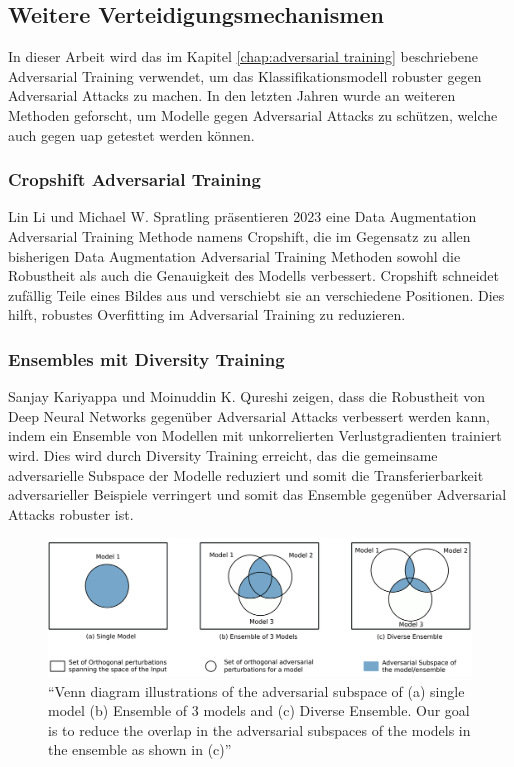 \subsection{Weitere Verteidigungsmechanismen} \label{chap:Weitere Verteidigungsmechanismen}
In dieser Arbeit wird das im Kapitel \ref{chap:adversarial training} beschriebene Adversarial Training verwendet, um das Klassifikationsmodell robuster gegen Adversarial Attacks zu machen. In den letzten Jahren wurde an weiteren Methoden geforscht, um Modelle gegen Adversarial Attacks zu schützen, welche auch gegen \acrlong{uap} getestet werden können.

\subsubsection{Cropshift Adversarial Training} \label{chap:Data Augementation}
Lin Li und Michael W. Spratling \cite{li_data_2022} präsentieren 2023 eine Data Augmentation Adversarial Training Methode namens Cropshift, die im Gegensatz zu allen bisherigen Data Augmentation Adversarial Training Methoden sowohl die Robustheit als auch die Genauigkeit des Modells verbessert. Cropshift schneidet zufällig Teile eines Bildes aus und verschiebt sie an verschiedene Positionen. Dies hilft, robustes Overfitting im Adversarial Training zu reduzieren.

\subsubsection{Ensembles mit Diversity Training} 
Sanjay Kariyappa und Moinuddin K. Qureshi \cite{kariyappa_improving_2019} zeigen, dass die Robustheit von Deep Neural Networks gegenüber Adversarial Attacks verbessert werden kann, indem ein Ensemble von Modellen mit unkorrelierten Verlustgradienten trainiert wird. Dies wird durch Diversity Training erreicht, das die gemeinsame adversarielle Subspace der Modelle reduziert und somit die Transferierbarkeit adversarieller Beispiele verringert und somit das Ensemble gegenüber Adversarial Attacks robuster ist. 

\begin{figure}[H]
    \centering
    \includegraphics[width=\linewidth]{01-images/06-ending/venn_diversity_training.png}
    \caption{``Venn diagram illustrations of the adversarial subspace of (a) single model (b) Ensemble of 3 models and (c) Diverse Ensemble. Our goal is to reduce the overlap in the adversarial subspaces of the models in the ensemble as shown in (c)'' \cite{kariyappa_improving_2019}}
    \label{fig:venn diversity training}
\end{figure}


